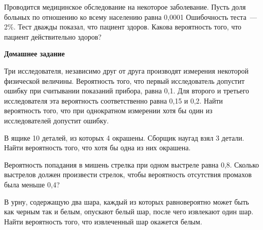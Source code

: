 \documentclass[a4paper,14pt]{extarticle}
\begin{document}
\begin{enumerate}
\item
Проводится медицинское обследование на некоторое заболевание.
Пусть доля больных по отношению ко всему населению равна 0,0001
Ошибочность теста~--- 2\%. 
Тест дважды показал, что пациент здоров. Какова вероятность того, что пациент действительно здоров?

{\item[]\centering\bfseries Домашнее задание\par}
\item
Три исследователя, независимо друг от друга производят измерения
некоторой физической величины. Вероятность того, что первый
исследователь допустит ошибку при считывании показаний прибора, равна
0,1. Для второго и третьего исследователя эта вероятность
соответственно равна 0,15 и 0,2. Найти вероятность того, что при
однократном измерении хотя бы один из исследователей допустит ошибку.
\item
В ящике 10 деталей, из которых 4 окрашены. Сборщик наугад взял 3 детали.
Найти вероятность того, что хотя бы одна из них окрашена.
\item
Вероятность попадания в мишень стрелка при одном выстреле равна 0,8.
Сколько выстрелов должен произвести стрелок, чтобы вероятность
отсутствия промахов была меньше 0,4?
\item
В урну, содержащую два шара, каждый из которых равновероятно может быть
как черным так и белым, опускают белый шар, после чего извлекают один
шар. Найти вероятность того, что извлеченный шар окажется белым.


\end{enumerate}
\end{document}

